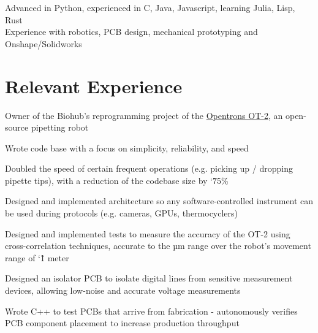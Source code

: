 \documentclass[]{deedy-resume-openfont}
\begin{document}

\begin{minipage}[t]{\textwidth}
	 Advanced in Python, experienced in C, Java, Javascript, learning Julia, Lisp, Rust\\
   Experience with robotics, PCB design, mechanical prototyping and Onshape/Solidworks
\end{minipage}

\vspace{12pt}

\section{Relevant Experience}

\begin{tightemize}
    \item Owner of the Biohub's reprogramming project of the \href{https://opentrons.com/ot-2/}{Opentrons OT-2}, an open-source pipetting robot
    \item Wrote code base with a focus on simplicity, reliability, and speed
    \item Doubled the speed of certain frequent operations (e.g. picking up / dropping pipette tips), with a reduction of the codebase size by \char`\~ 75\%
    \item Designed and implemented architecture so any software-controlled instrument can be used during protocols (e.g. cameras, GPUs, thermocyclers)
    \item Designed and implemented tests to measure the accuracy of the OT-2 using cross-correlation techniques, accurate to the µm range over the robot's movement range of \char`\~ 1 meter
\end{tightemize}

\vspace{8pt}

\begin{tightemize}
    \item Designed an isolator PCB to isolate digital lines from sensitive measurement devices, allowing low-noise and accurate voltage measurements
    \item Wrote C++ to test PCBs that arrive from fabrication - autonomously verifies PCB component placement to increase production throughput
\end{tightemize}
\end{document}
